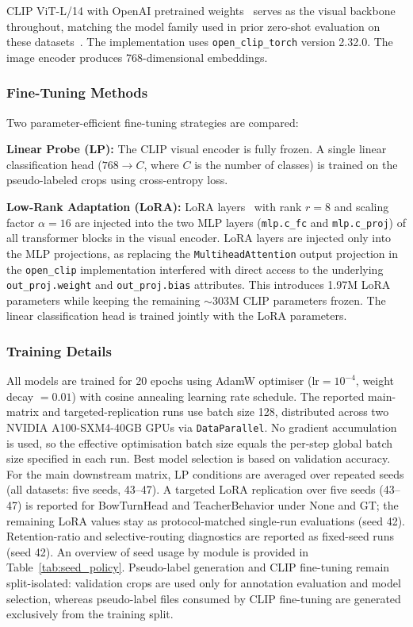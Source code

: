 \documentclass[10pt,letterpaper]{article}
\begin{document}
CLIP ViT-L/14 with OpenAI pretrained
weights~\cite{radford2021learning} serves as the visual backbone
throughout,
matching the model family used in prior zero-shot evaluation on these
datasets~\cite{scb_dataset}.
The implementation uses \texttt{open\_clip\_torch} version 2.32.0.
The image encoder produces 768-dimensional embeddings.

\subsubsection*{Fine-Tuning Methods}

Two parameter-efficient fine-tuning strategies are compared:

\textbf{Linear Probe (LP):} The CLIP visual encoder is fully frozen.
A single linear classification head ($768 \to C$, where $C$ is the
number of classes) is trained on the pseudo-labeled crops using
cross-entropy loss.

\textbf{Low-Rank Adaptation (LoRA):} LoRA layers~\cite{hu2022lora}
with rank $r=8$ and scaling factor $\alpha=16$ are injected into the
two MLP layers (\texttt{mlp.c\_fc} and \texttt{mlp.c\_proj}) of all
transformer blocks in the visual encoder.
LoRA layers are injected only into the MLP projections, as replacing
the \texttt{MultiheadAttention} output projection in the \texttt{open\_clip}
implementation interfered with direct access to the underlying
\texttt{out\_proj.weight} and \texttt{out\_proj.bias} attributes.
This introduces 1.97M LoRA parameters while keeping the remaining
$\sim$303M CLIP parameters frozen.
The linear classification head is trained jointly with the LoRA
parameters.

\subsubsection*{Training Details}

All models are trained for 20 epochs using AdamW optimiser
($\text{lr}=10^{-4}$, weight decay $= 0.01$) with cosine annealing
learning rate schedule.
The reported main-matrix and targeted-replication runs use batch size
128, distributed across two NVIDIA
A100-SXM4-40GB GPUs via \texttt{DataParallel}.
No gradient accumulation is used, so the effective optimisation batch
size equals the per-step global batch size specified in each run.
Best model selection is based on validation accuracy.
For the main downstream matrix, LP conditions are averaged over
repeated seeds (all datasets: five seeds, 43--47). A targeted LoRA replication over five seeds
(43--47) is reported for BowTurnHead and TeacherBehavior under None
and GT; the remaining LoRA values stay as protocol-matched single-run
evaluations (seed 42).
Retention-ratio and selective-routing diagnostics are reported as
fixed-seed runs (seed 42).
An overview of seed usage by module is provided in
Table~\ref{tab:seed_policy}.
Pseudo-label generation and CLIP fine-tuning remain split-isolated:
validation crops are used only for annotation evaluation and model
selection, whereas pseudo-label files consumed by CLIP fine-tuning are
generated exclusively from the training split.
\end{document}
